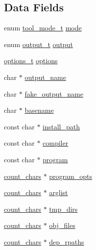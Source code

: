 \subsection*{Data Fields}
\begin{DoxyCompactItemize}
\item 
enum \hyperlink{jlibtool_8c_a66bdf42fa1cbffcc32b5ced12a8dec54}{tool\+\_\+mode\+\_\+t} \hyperlink{structcommand__t_ab859cb879d5afe524fdc0ca32f8b3320}{mode}
\item 
enum \hyperlink{jlibtool_8c_ab575fa20098c7d37cce6dd7e923f405c}{output\+\_\+t} \hyperlink{structcommand__t_afb7c0e23ed1ac392ed77a194ae7a2fd2}{output}
\item 
\hyperlink{structoptions__t}{options\+\_\+t} \hyperlink{structcommand__t_a632a0da6ed994b4482afad7bc6e86503}{options}
\item 
char $\ast$ \hyperlink{structcommand__t_a334c62ee92f60a89a20d52b506779d1e}{output\+\_\+name}
\item 
char $\ast$ \hyperlink{structcommand__t_af54b7d7afd263340fd76962434f7aeb5}{fake\+\_\+output\+\_\+name}
\item 
char $\ast$ \hyperlink{structcommand__t_a78695c3792a2ef8e8213ea2ba378c4a2}{basename}
\item 
const char $\ast$ \hyperlink{structcommand__t_a9a12ae8781cad01c7b3442cd5e74817b}{install\+\_\+path}
\item 
const char $\ast$ \hyperlink{structcommand__t_a0508604ac163028b5a803f0823a9635d}{compiler}
\item 
const char $\ast$ \hyperlink{structcommand__t_acbe7a361efbbb25cae2c5e5eead0a70a}{program}
\item 
\hyperlink{structcount__chars}{count\+\_\+chars} $\ast$ \hyperlink{structcommand__t_aec96be4925c8df350e63c8839ad6b8e7}{program\+\_\+opts}
\item 
\hyperlink{structcount__chars}{count\+\_\+chars} $\ast$ \hyperlink{structcommand__t_a9b6049a8a68adcbf76ad8139fc5f965b}{arglist}
\item 
\hyperlink{structcount__chars}{count\+\_\+chars} $\ast$ \hyperlink{structcommand__t_a59ce72a2d719f4c49e3027aa41abe86a}{tmp\+\_\+dirs}
\item 
\hyperlink{structcount__chars}{count\+\_\+chars} $\ast$ \hyperlink{structcommand__t_a98ae4574250fc2c45f6decd7b28dfb21}{obj\+\_\+files}
\item 
\hyperlink{structcount__chars}{count\+\_\+chars} $\ast$ \hyperlink{structcommand__t_a209378e7c863cae228690025a95e1747}{dep\+\_\+rpaths}
\item 

\end{DoxyCompactItemize}
